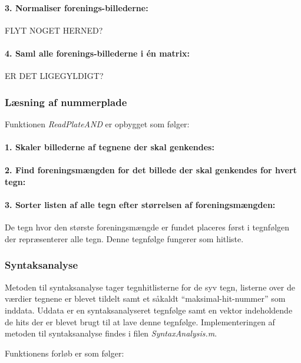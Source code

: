 \paragraph{3. Normaliser forenings-billederne:} FLYT NOGET HERNED?

\paragraph{4. Saml alle forenings-billederne i én matrix:} ER DET LIGEGYLDIGT?

\subsubsection*{Læsning af nummerplade}

Funktionen \textit{ReadPlateAND} er opbygget som følger:

\paragraph{1. Skaler billederne af tegnene der skal genkendes:}

\paragraph{2. Find foreningsmængden for det billede der skal genkendes for hvert tegn:}

\paragraph{3. Sorter listen af alle tegn efter størrelsen af foreningsmængden:} De tegn hvor den største foreningsmængde er fundet placeres først i tegnfølgen der repræsenterer alle tegn. Denne tegnfølge fungerer som hitliste.

\subsubsection{Syntaksanalyse}

Metoden til syntaksanalyse tager tegnhitlisterne for de syv tegn, listerne over de værdier tegnene er blevet tildelt samt et såkaldt ``maksimal-hit-nummer'' som inddata. Uddata er en syntaksanalyseret tegnfølge samt en vektor indeholdende de hits der er blevet brugt til at lave denne tegnfølge. Implementeringen af metoden til syntaksanalyse findes i filen \textit{SyntaxAnalysis.m}.

Funktionens forløb er som følger:

